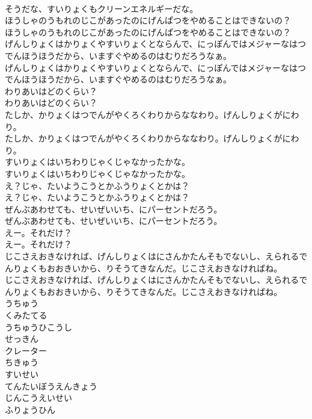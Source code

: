 \documentclass[8pt]{extreport}
\begin{document}
\begin{CJK}{UTF8}{min}
\\	そうだな、すいりょくもクリーンエネルギーだな。
\\	ほうしゃのうもれのじこがあったのにげんぱつをやめることはできないの？
\\	ほうしゃのうもれのじこがあったのにげんぱつをやめることはできないの？
\\	げんしりょくはかりょくやすいりょくとならんで、にっぽんではメジャーなはつでんほうほうだから、いますぐやめるのはむりだろうなぁ。
\\	げんしりょくはかりょくやすいりょくとならんで、にっぽんではメジャーなはつでんほうほうだから、いますぐやめるのはむりだろうなぁ。
\\	わりあいはどのくらい？
\\	わりあいはどのくらい？
\\	たしか、かりょくはつでんがやくろくわりからななわり。げんしりょくがにわり。
\\	たしか、かりょくはつでんがやくろくわりからななわり。げんしりょくがにわり。
\\	すいりょくはいちわりじゃくじゃなかったかな。
\\	すいりょくはいちわりじゃくじゃなかったかな。
\\	え？じゃ、たいようこうとかふうりょくとかは？
\\	え？じゃ、たいようこうとかふうりょくとかは？
\\	ぜんぶあわせても、せいぜいいち、にパーセントだろう。
\\	ぜんぶあわせても、せいぜいいち、にパーセントだろう。
\\	えー。それだけ？
\\	えー。それだけ？
\\	じこさえおきなければ、げんしりょくはにさんかたんそもでないし、えられるでんりょくもおおきいから、りそうてきなんだ。じこさえおきなければね。
\\	じこさえおきなければ、げんしりょくはにさんかたんそもでないし、えられるでんりょくもおおきいから、りそうてきなんだ。じこさえおきなければね。
\\	うちゅう
\\	くみたてる
\\	うちゅうひこうし
\\	せっきん
\\	クレーター
\\	ちきゅう
\\	すいせい
\\	てんたいぼうえんきょう
\\	じんこうえいせい
\\	ふりょうひん

\end{CJK}
\end{document}
